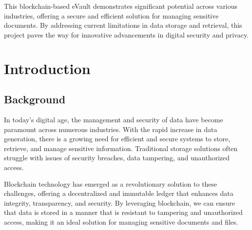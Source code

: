 \documentclass[12pt,a4paper]{report}
\begin{document}
This blockchain-based eVault demonstrates significant potential 
across various industries, offering a secure and efficient 
solution for managing sensitive documents. By addressing current 
limitations in data storage and retrieval, this project paves 
the way for innovative advancements in digital security and 
privacy.

\renewcommand{\contentsname}{Table of Contents}
\tableofcontents
{}
\listoffigures
{}
\newpage


\pagestyle{fancy}
\fancyhf{}
\renewcommand{\headrulewidth}{0.5pt}
\renewcommand{\footrulewidth}{0.5pt}




\chapter{Introduction}

\section{Background}

In today's digital age, the management and security of data have become paramount across numerous industries. With the rapid increase in data generation, there is a growing need for efficient and secure systems to store, retrieve, and manage sensitive information. Traditional storage solutions often struggle with issues of security breaches, data tampering, and unauthorized access. 

Blockchain technology has emerged as a revolutionary solution to these challenges, offering a decentralized and immutable ledger that enhances data integrity, transparency, and security. By leveraging blockchain, we can ensure that data is stored in a manner that is resistant to tampering and unauthorized access, making it an ideal solution for managing sensitive documents and files.
\end{document}
